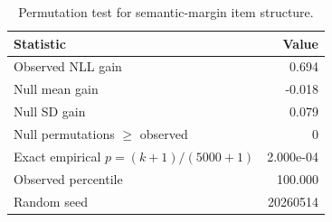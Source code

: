 \begin{table}[htbp]
\centering
\caption{Permutation test for semantic-margin item structure.}
\label{tab:permutation}
\begin{tabular}{lr}
\toprule
Statistic & Value \\
\midrule
Observed NLL gain & 0.694 \\
Null mean gain & -0.018 \\
Null SD gain & 0.079 \\
Null permutations $\geq$ observed & 0 \\
Exact empirical $p=(k+1)/(5000+1)$ & 2.000e-04 \\
Observed percentile & 100.000 \\
Random seed & 20260514 \\
\bottomrule
\end{tabular}
\end{table}
